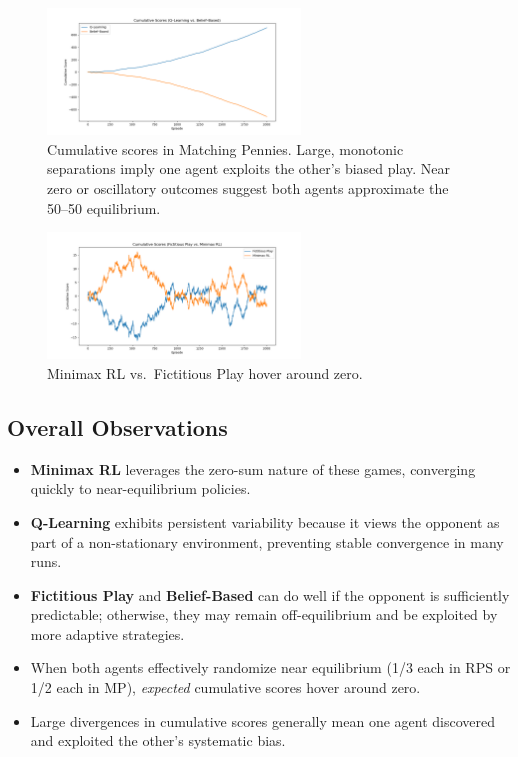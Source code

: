 \documentclass[11pt]{article}
\begin{document}
\begin{figure}[htbp]
    \centering
    \includegraphics[width=0.6\textwidth]{mp-plots/ql_vs_bp_cumulative.png}
    \caption{Cumulative scores in Matching Pennies. Large, monotonic 
    separations imply one agent exploits the other's biased play. Near 
    zero or oscillatory outcomes suggest both agents approximate the 
    50--50 equilibrium.}
    \label{fig:mp-ql-bb-cumulative}
\end{figure}

\begin{figure}[htbp]
    \centering
    \includegraphics[width=0.6\textwidth]{mp-plots/fp_vs_mm_cumulative.png}
    \caption{Minimax RL vs.\ Fictitious Play hover around 
    zero.}
    \label{fig:mp-fp-mm-cumulative}
\end{figure}

\subsection{Overall Observations}

\begin{itemize}
    \item \textbf{Minimax RL} leverages the zero-sum nature of these 
    games, converging quickly to near-equilibrium policies. 
    \item \textbf{Q-Learning} exhibits persistent variability because 
    it views the opponent as part of a non-stationary environment, 
    preventing stable convergence in many runs.
    \item \textbf{Fictitious Play} and \textbf{Belief-Based} can do 
    well if the opponent is sufficiently predictable; otherwise, they 
    may remain off-equilibrium and be exploited by more adaptive 
    strategies.
    \item When both agents effectively randomize near equilibrium 
    (1/3 each in RPS or 1/2 each in MP), \emph{expected} cumulative 
    scores hover around zero. 
    \item Large divergences in cumulative scores generally mean one 
    agent discovered and exploited the other's systematic bias.
\end{itemize}
\end{document}
